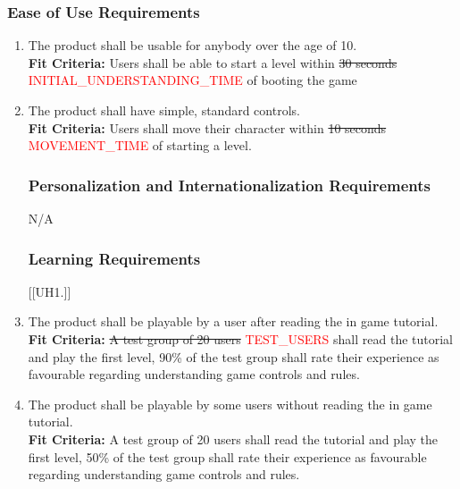 \documentclass[12pt, titlepage]{article}
\begin{document}
\subsubsection{Ease of Use Requirements}
\begin{enumerate}[{UH}1. ]
    \item The product shall be usable for anybody over the age of 10.\\
    \textbf{Fit Criteria:} Users shall be able to start a level within \sout{30 seconds} \textcolor{red}{INITIAL\_UNDERSTANDING\_TIME} of booting the game
    \item The product shall have simple, standard controls.\\
    \textbf{Fit Criteria:} Users shall move their character within \sout{10 seconds} \textcolor{red}{MOVEMENT\_TIME} of starting a level.

\subsubsection{Personalization and Internationalization Requirements}
N/A

\subsubsection{Learning Requirements}
[{[{UH}1.]}]
    \item The product shall be playable by a user after reading the in game tutorial.\\
    \textbf{Fit Criteria:} \sout{A test group of 20 users} \textcolor{red}{TEST\_USERS} shall read the tutorial and play the first level, 90\% of the test group shall rate their experience as favourable regarding understanding game controls and rules.
    \item The product shall be playable by some users without reading the in game tutorial.\\
    \textbf{Fit Criteria:} A test group of 20 users shall read the tutorial and play the first level, 50\% of the test group shall rate their experience as favourable regarding understanding game controls and rules.


\end{enumerate}
\end{document}
